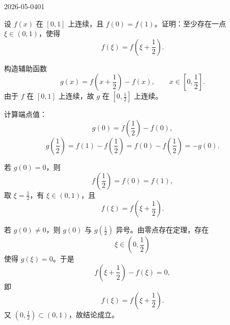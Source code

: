 \begin{mistake}{2026-05-04}{01}

\begin{problemcontent}
设 \(f(x)\) 在 \([0,1]\) 上连续，且 \(f(0)=f(1)\)。证明：至少存在一点 \(\xi\in(0,1)\)，使得
\[
f(\xi)=f\left(\xi+\frac12\right).
\]
\end{problemcontent}

\begin{solutioncontent}
构造辅助函数
\[
g(x)=f\left(x+\frac12\right)-f(x),\qquad x\in\left[0,\frac12\right].
\]
由于 \(f\) 在 \([0,1]\) 上连续，故 \(g\) 在 \(\left[0,\frac12\right]\) 上连续。

计算端点值：
\[
g(0)=f\left(\frac12\right)-f(0),
\]
\[
g\left(\frac12\right)=f(1)-f\left(\frac12\right)=f(0)-f\left(\frac12\right)=-g(0).
\]

若 \(g(0)=0\)，则
\[
f\left(\frac12\right)=f(0)=f(1),
\]
取 \(\xi=\frac12\)，有 \(\xi\in(0,1)\)，且
\[
f(\xi)=f\left(\xi+\frac12\right).
\]

若 \(g(0)\ne 0\)，则 \(g(0)\) 与 \(g\left(\frac12\right)\) 异号。由零点存在定理，存在
\[
\xi\in\left(0,\frac12\right)
\]
使得 \(g(\xi)=0\)。于是
\[
f\left(\xi+\frac12\right)-f(\xi)=0,
\]
即
\[
f(\xi)=f\left(\xi+\frac12\right).
\]
又 \(\left(0,\frac12\right)\subset(0,1)\)，故结论成立。
\end{solutioncontent}


\end{mistake}
